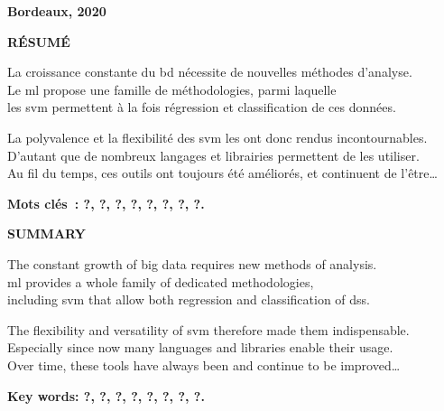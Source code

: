 {}

\cnam

\begin{large}\fulltitle\end{large}

\textbf{\goal}

\textbf{Bordeaux, 2020}

\hr

\textbf{RÉSUMÉ}

La croissance constante du \gls{bd} nécessite de nouvelles méthodes d’analyse.\\
Le \gls{ml} propose une famille de méthodologies, parmi laquelle\\
les \gls{svm} permettent à la fois régression et classification de ces données.

La polyvalence et la flexibilité des \gls{svm} les ont donc rendus incontournables.\\
D’autant que de nombreux langages et librairies permettent de les utiliser.\\
Au fil du temps, ces outils ont toujours été améliorés, et continuent de l’être…

\textbf{Mots clés : ?, ?, ?, ?, ?, ?, ?, ?.}

\hr

\textbf{SUMMARY}

The constant growth of big data requires new methods of analysis.\\
\Gls{ml} provides a whole family of dedicated methodologies,\\
including \gls{svm} that allow both regression and classification of \glspl{ds}.

The flexibility and versatility of \gls{svm} therefore made them indispensable.\\
Especially since now many languages and libraries enable their usage.\\
Over time, these tools have always been and continue to be improved…

\textbf{Key words: ?, ?, ?, ?, ?, ?, ?, ?.}

\thispagestyle{empty}

\pagebreak
